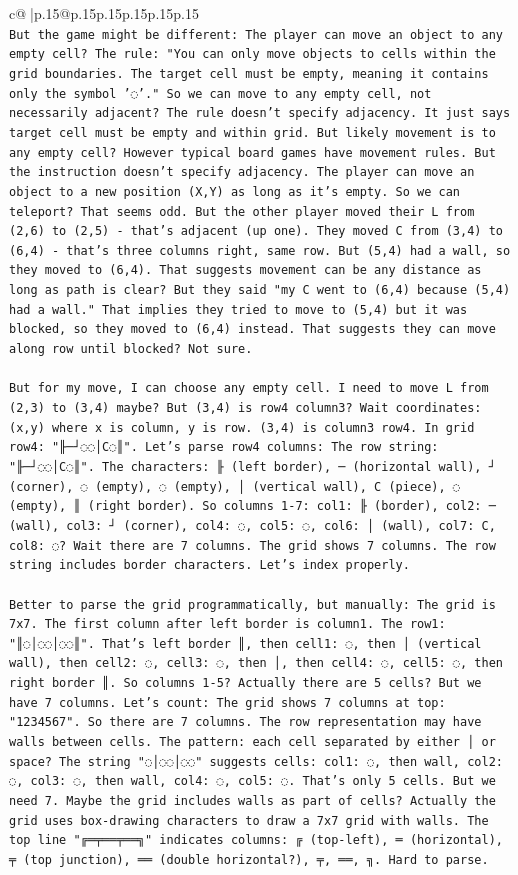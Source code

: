 \documentclass{article}
\begin{document}
{\begin{supertabular}{c@{$\;$}|p{.15\linewidth}@{}p{.15\linewidth}p{.15\linewidth}p{.15\linewidth}p{.15\linewidth}p{.15\linewidth}}
{{{\\ 
\texttt{But the game might be different: The player can move an object to any empty cell? The rule: "You can only move objects to cells within the grid boundaries. The target cell must be empty, meaning it contains only the symbol '◌'." So we can move to any empty cell, not necessarily adjacent? The rule doesn't specify adjacency. It just says target cell must be empty and within grid. But likely movement is to any empty cell? However typical board games have movement rules. But the instruction doesn't specify adjacency. The player can move an object to a new position (X,Y) as long as it's empty. So we can teleport? That seems odd. But the other player moved their L from (2,6) to (2,5) {-} that's adjacent (up one). They moved C from (3,4) to (6,4) {-} that's three columns right, same row. But (5,4) had a wall, so they moved to (6,4). That suggests movement can be any distance as long as path is clear? But they said "my C went to (6,4) because (5,4) had a wall." That implies they tried to move to (5,4) but it was blocked, so they moved to (6,4) instead. That suggests they can move along row until blocked? Not sure.} \\
\\ 
\texttt{But for my move, I can choose any empty cell. I need to move L from (2,3) to (3,4) maybe? But (3,4) is row4 column3? Wait coordinates: (x,y) where x is column, y is row. (3,4) is column3 row4. In grid row4: "╟─┘◌◌│C◌║". Let's parse row4 columns: The row string: "╟─┘◌◌│C◌║". The characters: ╟ (left border), ─ (horizontal wall), ┘ (corner), ◌ (empty), ◌ (empty), │ (vertical wall), C (piece), ◌ (empty), ║ (right border). So columns 1{-}7: col1: ╟ (border), col2: ─ (wall), col3: ┘ (corner), col4: ◌, col5: ◌, col6: │ (wall), col7: C, col8: ◌? Wait there are 7 columns. The grid shows 7 columns. The row string includes border characters. Let's index properly.} \\
\\ 
\texttt{Better to parse the grid programmatically, but manually: The grid is 7x7. The first column after left border is column1. The row1: "║◌│◌◌│◌◌║". That's left border ║, then cell1: ◌, then │ (vertical wall), then cell2: ◌, cell3: ◌, then │, then cell4: ◌, cell5: ◌, then right border ║. So columns 1{-}5? Actually there are 5 cells? But we have 7 columns. Let's count: The grid shows 7 columns at top: "1234567". So there are 7 columns. The row representation may have walls between cells. The pattern: each cell separated by either │ or space? The string "◌│◌◌│◌◌" suggests cells: col1: ◌, then wall, col2: ◌, col3: ◌, then wall, col4: ◌, col5: ◌. That's only 5 cells. But we need 7. Maybe the grid includes walls as part of cells? Actually the grid uses box{-}drawing characters to draw a 7x7 grid with walls. The top line "╔═╤══╤══╗" indicates columns: ╔ (top{-}left), ═ (horizontal), ╤ (top junction), ══ (double horizontal?), ╤, ══, ╗. Hard to parse.} \\
}}}
\end{supertabular}}
\end{document}
